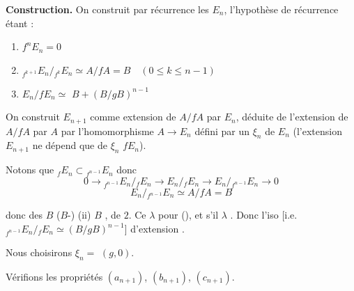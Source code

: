 \documentclass[11pt,a4paper]{article}
\begin{document}
\textbf{Construction.} On construit par récurrence les $E_n$, l'hypothèse
de récurrence étant :
\begin{enumerate}
\item[(1)] $f^n E_n = 0$
\item[(2)] ${}_{f^{k+1}}E_n / {}_{f^k}E_n \simeq A/fA = B \quad (0 \leqslant k \leqslant n-1)$
\item[(3)] $E_n / fE_n \simeq$  $B + (B/gB)^{n-1}$
\end{enumerate}

On construit $E_{n+1}$ comme extension de $A/fA$ par $E_n$, déduite de
l'extension  de $A/fA$ par $A$ \ill{} par
l'homomorphisme \struck{\ill{}} $A \to E_n$ défini par un \ill{} $\xi_n$ de
$E_n$ (l'extension $E_{n+1}$ ne dépend que de $\xi_n$ 
$fE_n$).



Notons que ${}_fE_n \subset {}_{f^{n-1}}E_n$ donc
\[
0 \longrightarrow {}_{f^{n-1}}E_n / {}_fE_n \longrightarrow E_n / {}_fE_n
\longrightarrow E_n / {}_{f^{n-1}}E_n \longrightarrow 0
\]
\[
E_n / {}_{f^{n-1}}E_n \simeq A/fA = B
\]

donc \ill{} des $B$  \struck{\ill{}} ($B$-\ill{}) \ill{} (ii)
$B$ \ill{}, \ill{} de \ill{} $2$. Ce \struck{\ill{}} \ill{} $\lambda$ pour
(\ill{}), et s'il \ill{} $\lambda$ \ill{}. Donc l'iso\ill{} \ill{}
[i.e.\ ${}_{f^{n-1}}E_n / {}_fE_n \simeq (B/gB)^{n-1}$] d'extension
\ill{}.

Nous choisirons $\xi_n =$ \struck{\ill{}} $(g, 0)$. 

Vérifions les propriétés $(a_{n+1})$, $(b_{n+1})$, $(c_{n+1})$.
\end{document}
